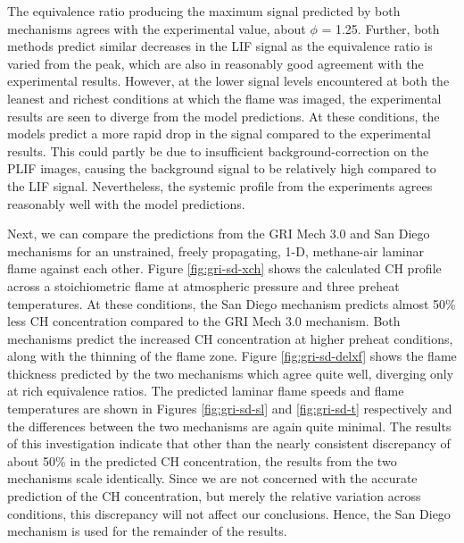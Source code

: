 

The equivalence ratio producing the maximum signal predicted by both mechanisms agrees with the experimental value, about \(\phi\) = 1.25.
Further, both methods predict similar decreases in the LIF signal as the equivalence ratio is varied from the peak, which are also in reasonably good agreement with the experimental results.
However, at the lower signal levels encountered at both the leanest and richest conditions at which the flame was imaged, the experimental results are seen to diverge from the model predictions.
At these conditions, the models predict a more rapid drop in the signal compared to the experimental results.
This could partly be due to insufficient background-correction on the PLIF images, causing the background signal to be relatively high compared to the LIF signal.
Nevertheless, the systemic profile from the experiments agrees reasonably well with the model predictions.

Next, we can compare the predictions from the GRI Mech 3.0 and San Diego mechanisms for an unstrained, freely propagating, 1-D, methane-air laminar flame against each other.
Figure \ref{fig:gri-sd-xch} shows the calculated CH profile across a stoichiometric flame at atmospheric pressure and three preheat temperatures.
At these conditions, the San Diego mechanism predicts almost 50\% less CH concentration compared to the GRI Mech 3.0 mechanism.
Both mechanisms predict the increased CH concentration at higher preheat conditions, along with the thinning of the flame zone.
Figure \ref{fig:gri-sd-delxf} shows the flame thickness predicted by the two mechanisms which agree quite well, diverging only at rich equivalence ratios.
The predicted laminar flame speeds and flame temperatures are shown in Figures \ref{fig:gri-sd-sl} and \ref{fig:gri-sd-t} respectively and the differences between the two mechanisms are again quite minimal.
The results of this investigation indicate that other than the nearly consistent discrepancy of about 50\% in the predicted CH concentration, the results from the two mechanisms scale identically.
Since we are not concerned with the accurate prediction of the CH concentration, but merely the relative variation across conditions, this discrepancy will not affect our conclusions.
Hence, the San Diego mechanism is used for the remainder of the results.



